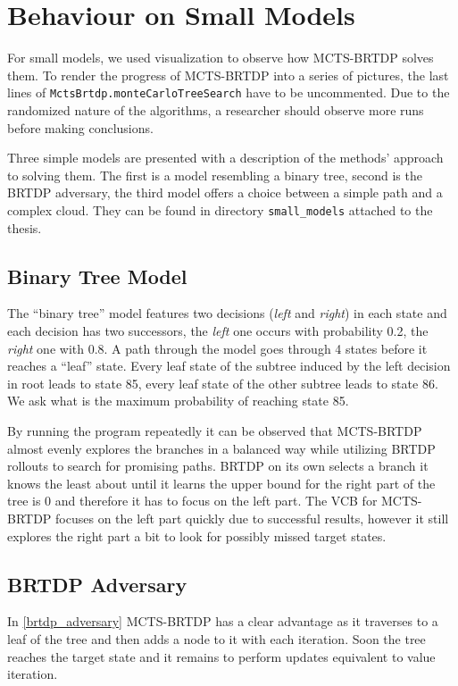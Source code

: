 \section{Behaviour on Small Models}

For small models, we used visualization to observe how MCTS-BRTDP solves
them. To render the progress of MCTS-BRTDP into a series of pictures,
the last lines of \verb|MctsBrtdp.monteCarloTreeSearch| have to be
uncommented.  Due to the randomized nature of the algorithms,
a researcher should observe more runs before making conclusions.

Three simple models are presented with a description of the methods'
approach to solving them.
The first is a model resembling a binary tree, second is
the BRTDP adversary, the third model offers a choice between a simple
path and a complex cloud. They can be found in directory
\verb|small_models| attached to the thesis.

\subsection*{Binary Tree Model}

The ``binary tree'' model features two decisions ({\em left} and {\em
right}) in each state and each decision has two successors,
the {\em left} one occurs with probability 0.2,
the {\em right} one with 0.8. A path through the model goes through 4 states
before it reaches a ``leaf'' state. Every leaf state of the subtree
induced by the left decision in root leads to state 85, every leaf state
of the other subtree leads to state 86. We ask what is the maximum
probability of reaching state 85.

By running the program repeatedly it can be observed that MCTS-BRTDP
almost evenly explores the branches in a balanced way while utilizing
BRTDP rollouts to search for promising paths. BRTDP on its own
selects a branch it knows the least about until it learns the upper bound
for the right part of the tree is 0 and therefore it has to focus on the
left part. The VCB for MCTS-BRTDP focuses on the left part quickly due
to successful results, however it still explores the right part a bit to
look for possibly missed target states.%

\subsection*{BRTDP Adversary}

In \autoref{brtdp_adversary} MCTS-BRTDP has a clear advantage as it
traverses to a leaf of the tree and then adds a node to it with each iteration.
Soon the tree reaches the target state and it remains to perform updates
equivalent to value iteration.


